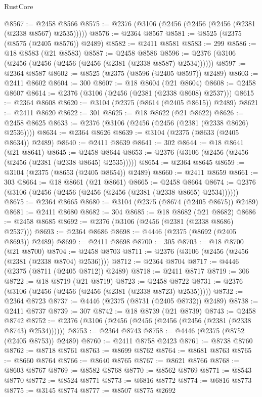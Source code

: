 \begin{lexlean}{RustCore}
\begin{coremodule}
@8567 := @2458 @8566
@8575 := @2376 (@3106 (@2456 (@2456 (@2456 (@2381 (@2338 @8567) @2535)))))
@8576 := @2364 @8567
@8581 := @8525 (@2375 (@8575 (@2405 @8576)) @2489)
@8582 := @2411 @8581
@8583 := 299
@8586 := @18 @8583 (@21 @8583)
@8587 := @2458 @8586
@8596 := @2376 (@3106 (@2456 (@2456 (@2456 (@2456 (@2381 (@2338 @8587) @2534))))))
@8597 := @2364 @8587
@8602 := @8525 (@2375 (@8596 (@2405 @8597)) @2489)
@8603 := @2411 @8602
@8604 := 300
@8607 := @18 @8604 (@21 @8604)
@8608 := @2458 @8607
@8614 := @2376 (@3106 (@2456 (@2381 (@2338 @8608) @2537)))
@8615 := @2364 @8608
@8620 := @3104 (@2375 (@8614 (@2405 @8615)) @2489)
@8621 := @2411 @8620
@8622 := 301
@8625 := @18 @8622 (@21 @8622)
@8626 := @2458 @8625
@8633 := @2376 (@3106 (@2456 (@2456 (@2381 (@2338 @8626) @2536))))
@8634 := @2364 @8626
@8639 := @3104 (@2375 (@8633 (@2405 @8634)) @2489)
@8640 := @2411 @8639
@8641 := 302
@8644 := @18 @8641 (@21 @8641)
@8645 := @2458 @8644
@8653 := @2376 (@3106 (@2456 (@2456 (@2456 (@2381 (@2338 @8645) @2535)))))
@8654 := @2364 @8645
@8659 := @3104 (@2375 (@8653 (@2405 @8654)) @2489)
@8660 := @2411 @8659
@8661 := 303
@8664 := @18 @8661 (@21 @8661)
@8665 := @2458 @8664
@8674 := @2376 (@3106 (@2456 (@2456 (@2456 (@2456 (@2381 (@2338 @8665) @2534))))))
@8675 := @2364 @8665
@8680 := @3104 (@2375 (@8674 (@2405 @8675)) @2489)
@8681 := @2411 @8680
@8682 := 304
@8685 := @18 @8682 (@21 @8682)
@8686 := @2458 @8685
@8692 := @2376 (@3106 (@2456 (@2381 (@2338 @8686) @2537)))
@8693 := @2364 @8686
@8698 := @4446 (@2375 (@8692 (@2405 @8693)) @2489)
@8699 := @2411 @8698
@8700 := 305
@8703 := @18 @8700 (@21 @8700)
@8704 := @2458 @8703
@8711 := @2376 (@3106 (@2456 (@2456 (@2381 (@2338 @8704) @2536))))
@8712 := @2364 @8704
@8717 := @4446 (@2375 (@8711 (@2405 @8712)) @2489)
@8718 := @2411 @8717
@8719 := 306
@8722 := @18 @8719 (@21 @8719)
@8723 := @2458 @8722
@8731 := @2376 (@3106 (@2456 (@2456 (@2456 (@2381 (@2338 @8723) @2535)))))
@8732 := @2364 @8723
@8737 := @4446 (@2375 (@8731 (@2405 @8732)) @2489)
@8738 := @2411 @8737
@8739 := 307
@8742 := @18 @8739 (@21 @8739)
@8743 := @2458 @8742
@8752 := @2376 (@3106 (@2456 (@2456 (@2456 (@2456 (@2381 (@2338 @8743) @2534))))))
@8753 := @2364 @8743
@8758 := @4446 (@2375 (@8752 (@2405 @8753)) @2489)
@8760 := @2411 @8758 @2423
@8761 := @8738 @8760
@8762 := @8718 @8761
@8763 := @8699 @8762
@8764 := @8681 @8763
@8765 := @8660 @8764
@8766 := @8640 @8765
@8767 := @8621 @8766
@8768 := @8603 @8767
@8769 := @8582 @8768
@8770 := @8562 @8769
@8771 := @8543 @8770
@8772 := @8524 @8771
@8773 := @6816 @8772
@8774 := @6816 @8773
@8775 := @3145 @8774
@8777 := @8507 @8775 @2692

\end{coremodule}
\end{lexlean}
